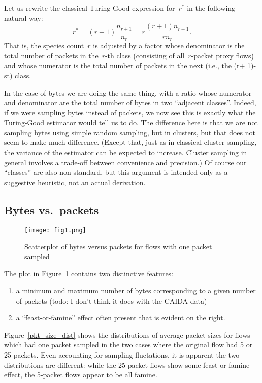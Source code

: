 \documentclass{paper}
\begin{document}
Let us rewrite the classical Turing-Good expression for~$r^*$ in the following
natural way:
$$ r^* =(r + 1) \frac{n_{r+1}}{n_r} = r \frac{(r+1)n_{r+1}}{rn_r}. $$
That is, the species count~$r$ is adjusted by a factor whose denominator is the
total number of packets in the~$r$-th class (consisting of all~$r$-packet proxy
flows) and whose numerator is the total number of packets in the next (i.e., the
(r+ 1)- st) class.

In the case of bytes we are doing the same thing, with a ratio whose numerator
and denominator are the total number of bytes in two ``adjacent classes''.
Indeed, if we were sampling bytes instead of packets, we now see this is exactly
what the Turing-Good estimator would tell us to do. The difference here is that
we are not sampling bytes using simple random sampling, but in clusters, but
that does not seem to make much difference. (Except that, just as in classical
cluster sampling, the variance of the estimator can be expected to increase.
Cluster sampling in general involves a trade-off between convenience and
precision.) Of course our ``classes'' are also non-standard, but this argument
is intended only as a suggestive heuristic, not an actual derivation.

\subsection{Bytes vs.\ packets}

\begin{figure}[h]
\begin{center}
\texttt{[image: fig1.png]}
\caption{Scatterplot of bytes versus packets for flows with one packet sampled}
\label{pb_plot}
\end{center}
\end{figure}

The plot in Figure~\ref{pb_plot} contains two distinctive features:
\begin{enumerate}
  \item a minimum and maximum number of bytes corresponding to a given number
    of packets (todo: I don't think it does with the CAIDA data)
  \item a ``feast-or-famine'' effect often present that is evident on the
    right.
\end{enumerate}
Figure~\ref{pkt_size_dist} shows the distributions of average packet sizes for flows which
had one packet sampled in the two cases where the original flow had 5 or 25
packets. Even accounting for sampling fluctations, it is apparent the two
distributions are different: while the 25-packet flows show some feast-or-famine
effect, the 5-packet flows appear to be all famine.
\end{document}
